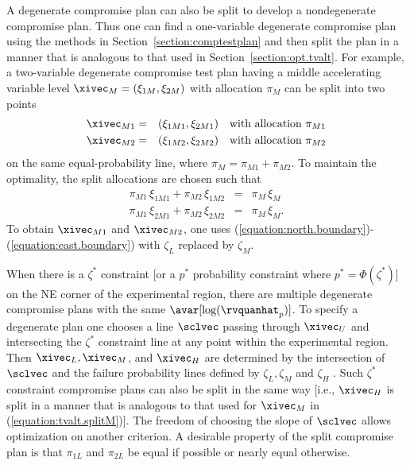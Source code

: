 A degenerate compromise plan can also be split to develop a
nondegenerate compromise plan.  Thus one can find a one-variable
degenerate compromise plan using the methods in
Section~\ref{section:comptestplan} and then split the plan in a
manner that is analogous to that used in
Section~\ref{section:opt.tvalt}.  For example, a two-variable
degenerate compromise test plan having a middle accelerating
variable level $\xivec_{M}=(\xi_{1M},\xi_{2M})$ with allocation
$\pi_{M}$ can be split into two points
\begin{eqnarray*} 
\xivec_{M1} &=& (\xi_{1M1},\xi_{2M1})\quad\text{with allocation } \pi_{M1}\\
\xivec_{M2} &=& (\xi_{1M2},\xi_{2M2})\quad\text{with allocation } \pi_{M2}
\end{eqnarray*} 
on the same equal-probability line, where $\pi_{M}=\pi_{M1}+\pi_{M2}$. 
To maintain the optimality, the split allocations are chosen such that
\begin{eqnarray} 
\label{equation:tvalt.splitM}
\pi_{M1} \, \xi_{1M1} + \pi_{M2} \, \xi_{1M2} &=& \pi_{M} \, \xi_{M}\\
\nonumber
\pi_{M1} \, \xi_{2M1} + \pi_{M2} \, \xi_{2M2} &=& \pi_{M} \, \xi_{M}.
\end{eqnarray}  
To obtain $\xivec_{M1}$ and
$\xivec_{M2}$, one uses 
(\ref{equation:north.boundary})-(\ref{equation:east.boundary})
with $\zeta_{L}$ replaced by $\zeta_{M}$.


When there is a $\zeta^{*}$ constraint [or a $p^{*}$ probability constraint
where $p^{*}=\Phi(\zeta^{*})$] on the NE corner of the experimental
region, there are multiple degenerate compromise plans with the same
$\avar[\log(\rvquanhat_{p})]$. To specify a degenerate plan one
chooses a line $\sclvec$ passing through $\xivec_{U}$ and
intersecting the $\zeta^{*}$ constraint line at any point within the
experimental region.  Then $\xivec_{L},
\xivec_{M}$, and $\xivec_{H}$ are determined by the intersection of
$\sclvec$ and the failure probability lines defined by
$\zeta_{L},\zeta_{M}$ and $\zeta_{H}$ .  Such $\zeta^{*}$ constraint
compromise plans can also be split in the same way [i.e.,
$\xivec_{H}$ is split in a manner that is analogous to that used for
$\xivec_{M}$ in (\ref{equation:tvalt.splitM})].  The freedom of
choosing the slope of $\sclvec$ allows optimization on another
criterion.  A desirable property of the split compromise plan is
that $\pi_{1L}$ and $\pi_{2L}$ be equal if possible or nearly equal
otherwise.


